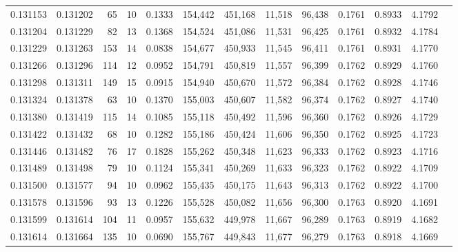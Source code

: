 \begin{tabular}{rrrrrrrrrrrrr}
0.131153 & 0.131202 &    65 &  10 &                                     0.1333 & 154,442 & 451,168 &  11,518 &  96,438 & 0.1761 & 0.8933 & 4.1792 \\
0.131204 & 0.131229 &    82 &  13 &                                     0.1368 & 154,524 & 451,086 &  11,531 &  96,425 & 0.1761 & 0.8932 & 4.1784 \\
0.131229 & 0.131263 &   153 &  14 &                                     0.0838 & 154,677 & 450,933 &  11,545 &  96,411 & 0.1761 & 0.8931 & 4.1770 \\
0.131266 & 0.131296 &   114 &  12 &                                     0.0952 & 154,791 & 450,819 &  11,557 &  96,399 & 0.1762 & 0.8929 & 4.1760 \\
0.131298 & 0.131311 &   149 &  15 &                                     0.0915 & 154,940 & 450,670 &  11,572 &  96,384 & 0.1762 & 0.8928 & 4.1746 \\
0.131324 & 0.131378 &    63 &  10 &                                     0.1370 & 155,003 & 450,607 &  11,582 &  96,374 & 0.1762 & 0.8927 & 4.1740 \\
0.131380 & 0.131419 &   115 &  14 &                                     0.1085 & 155,118 & 450,492 &  11,596 &  96,360 & 0.1762 & 0.8926 & 4.1729 \\
0.131422 & 0.131432 &    68 &  10 &                                     0.1282 & 155,186 & 450,424 &  11,606 &  96,350 & 0.1762 & 0.8925 & 4.1723 \\
0.131446 & 0.131482 &    76 &  17 &                                     0.1828 & 155,262 & 450,348 &  11,623 &  96,333 & 0.1762 & 0.8923 & 4.1716 \\
0.131489 & 0.131498 &    79 &  10 &                                     0.1124 & 155,341 & 450,269 &  11,633 &  96,323 & 0.1762 & 0.8922 & 4.1709 \\
0.131500 & 0.131577 &    94 &  10 &                                     0.0962 & 155,435 & 450,175 &  11,643 &  96,313 & 0.1762 & 0.8922 & 4.1700 \\
0.131578 & 0.131596 &    93 &  13 &                                     0.1226 & 155,528 & 450,082 &  11,656 &  96,300 & 0.1763 & 0.8920 & 4.1691 \\
0.131599 & 0.131614 &   104 &  11 &                                     0.0957 & 155,632 & 449,978 &  11,667 &  96,289 & 0.1763 & 0.8919 & 4.1682 \\
0.131614 & 0.131664 &   135 &  10 &                                     0.0690 & 155,767 & 449,843 &  11,677 &  96,279 & 0.1763 & 0.8918 & 4.1669 \\

\end{tabular}

